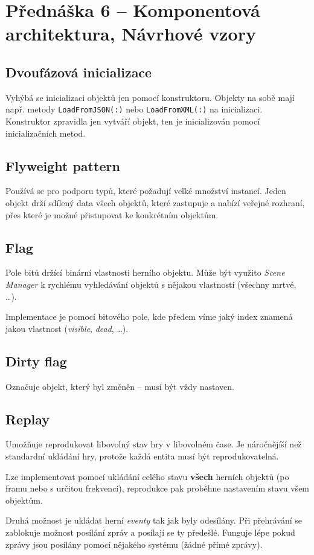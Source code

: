 \section{Přednáška 6 -- Komponentová architektura, Návrhové vzory}

\subsection*{Dvoufázová inicializace}

Vyhýbá se inicializaci objektů jen pomocí konstruktoru.
Objekty na sobě mají např. metody \texttt{LoadFromJSON(:)} nebo \texttt{LoadFromXML(:)} na inicializaci.
Konstruktor zpravidla jen vytváří objekt, ten je inicializován pomocí inicializačních metod.

\subsection*{Flyweight pattern}

Používá se pro podporu typů, které požadují velké množství instancí.
Jeden objekt drží sdílený data všech objektů, které zastupuje a nabízí veřejné rozhraní, přes které je možné přistupovat ke konkrétním objektům.

\subsection*{Flag}

Pole bitů držící binární vlastnosti herního objektu.
Může být využito \textit{Scene Manager} k rychlému vyhledávání objektů s nějakou vlastností (všechny mrtvé, \dots).

Implementace je pomocí bitového pole, kde předem víme jaký index znamená jakou vlastnost (\textit{visible}, \textit{dead}, \dots).

\subsection*{Dirty flag}

Označuje objekt, který byl změněn -- musí být vždy nastaven.

\subsection*{Replay}

Umožňuje reprodukovat libovolný stav hry v libovolném čase.
Je náročnějíší než standardní ukládání hry, protože každá entita musí být reprodukovatelná.

Lze implementovat pomocí ukládání celého stavu \textbf{všech} herních objektů (po framu nebo s určitou frekvencí), reprodukce pak proběhne nastavením stavu všem objektům.

Druhá možnost je ukládat herní \textit{eventy} tak jak byly odesílány.
Při přehrávání se zablokuje možnost posílání zpráv a posílají se ty předešlé.
Funguje lépe pokud zprávy jsou posílány pomocí nějakého systému (žádné přímé zprávy).
